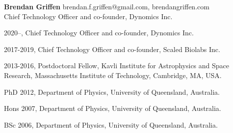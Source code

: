 \documentclass[12pt,letterpaper]{article}
\begin{document}
\thispagestyle{empty}\sloppy\sloppypar\raggedbottom

\textbf{\Large Brendan Griffen} \hfill
\textsf{\small brendan.f.griffen@gmail.com, brendangriffen.com} \\[0.5ex]
Chief Technology Officer and co-founder, Dynomics Inc.\\[0.5ex]

\begin{list}{}{\cvlist}
\item
2020--, Chief Technology Officer and co-founder, Dynomics Inc.
\item
2017-2019, Chief Technology Officer and co-founder, Scaled Biolabs Inc.
\item
2013-2016, Postdoctoral Fellow, Kavli Institute for Astrophysics and Space Research, Massachusetts Institute of Technology, Cambridge, MA, USA.
\item
PhD 2012, Department of Physics, University of Queensland, Australia.
\item
Hons 2007, Department of Physics, University of Queensland, Australia.
\item
BSc 2006, Department of Physics, University of Queensland, Australia.
\end{list}

\begin{list}{}{\cvlist}

\end{list}
\end{document}
